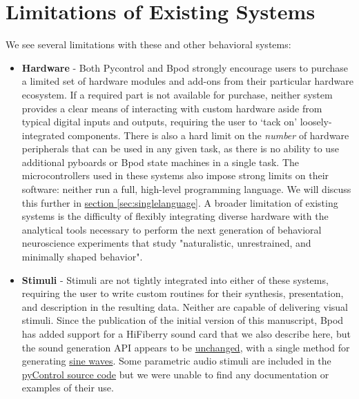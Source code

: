 
\section{Limitations of Existing Systems}
\label{sec:limitations}

We see several limitations with these and other behavioral systems:

\begin{itemize}[after=\vspace{-\topsep}]
    \item \textbf{Hardware} - Both Pycontrol and Bpod strongly encourage users to purchase a limited set of hardware modules and add-ons from their particular hardware ecosystem. If a required part is not available for purchase, neither system provides a clear means of interacting with custom hardware aside from typical digital inputs and outputs, requiring the user to `tack on' loosely-integrated components. There is also a hard limit on the \textit{number} of hardware peripherals that can be used in any given task, as there is no ability to use additional pyboards or Bpod state machines in a single task. The microcontrollers used in these systems also impose strong limits on their software: neither run a full, high-level programming language. We will discuss this further in \hyperref[sec:singlelanguage]{section \ref*{sec:singlelanguage}}. A broader  limitation of existing systems is the difficulty of flexibly integrating diverse hardware with the analytical tools necessary to perform the next generation of behavioral neuroscience experiments that study "naturalistic, unrestrained, and minimally shaped behavior"\citep{dattaComputationalNeuroethologyCall2019}.
    \item \textbf{Stimuli} - Stimuli are not tightly integrated into either of these systems, requiring the user to write custom routines for their synthesis, presentation, and description in the resulting data. Neither are capable of delivering visual stimuli. Since the publication of the initial version of this manuscript, Bpod has added support for a HiFiberry sound card that we also describe here\citep{sanworksllc.ReasonsUseBpod2021}, but the sound generation API appears to be \href{https://github.com/sanworks/Bpod_Gen2/blob/df6cd0c7d5df8247b02077b05fc263f79b86b096/Examples/Protocols/Sound/HiFiSound2AFC_TrialManager/HiFiSound2AFC_TrialManager.m}{unchanged}, with a single method for generating \href{https://github.com/sanworks/Bpod_Gen2/blob/1cb181dffbb7394acd18819f1d268fd9dec6ec5b/Functions/Internal%20Functions/GenerateSineWave.m}{sine waves}. Some parametric audio stimuli are included in the \href{https://github.com/pyControl/code/blob/master/pyControl/audio.py}{pyControl source code} but we were unable to find any documentation or examples of their use. %
\end{itemize}\nobreak%
